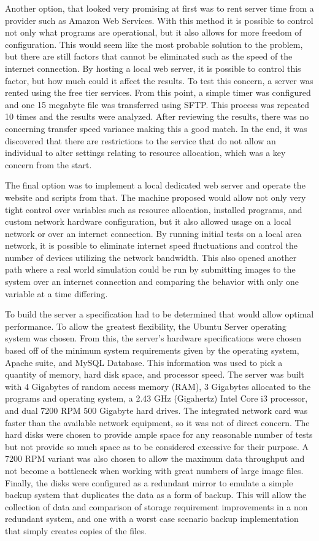 Another option, that looked very promising at first was to rent server time from a provider such as Amazon Web Services. With this method it is possible to control not only what programs are operational, but it also allows for more freedom of configuration. This would seem like the most probable solution to the problem, but there are still factors that cannot be eliminated such as the speed of the internet connection. By hosting a local web server, it is possible to control this factor, but how much could it affect the results. To test this concern, a server was rented using the free tier services. From this point, a simple timer was configured and one 15 megabyte file was transferred using SFTP. This process was repeated 10 times and the results were analyzed. After reviewing the results, there was no concerning transfer speed variance making this a good match. In the end, it was discovered that there are restrictions to the service that do not allow an individual to alter settings relating to resource allocation, which was a key concern from the start.

The final option was to implement a local dedicated web server and operate the website and scripts from that. The machine proposed would allow not only very tight control over variables such as resource allocation, installed programs, and custom network hardware configuration, but it also allowed usage on a local network or over an internet connection. By running initial tests on a local area network, it is possible to eliminate internet speed fluctuations and control the number of devices utilizing the network bandwidth. This also opened another path where a real world simulation could be run by submitting images to the system over an internet connection and comparing the behavior with only one variable at a time differing.

To build the server a specification had to be determined that would allow optimal performance. To allow the greatest flexibility, the Ubuntu Server operating system was chosen. From this, the server's hardware specifications were chosen based off of the minimum system requirements given by the operating system, Apache suite, and MySQL Database. This information was used to pick a quantity of memory, hard disk space, and processor speed. The server was built with 4 Gigabytes of random access memory (RAM), 3 Gigabytes allocated to the programs and operating system, a 2.43 GHz (Gigahertz) Intel Core i3 processor, and dual 7200 RPM 500 Gigabyte hard drives. The integrated network card was faster than the available network equipment, so it was not of direct concern. The hard disks were chosen to provide ample space for any reasonable number of tests but not provide so much space as to be considered excessive for their purpose. A 7200 RPM variant was also chosen to allow the maximum data throughput and not become a bottleneck when working with great numbers of large image files. Finally, the disks were configured as a redundant mirror to emulate a simple backup system that duplicates the data as a form of backup. This will allow the collection of data and comparison of storage requirement improvements in a non redundant system, and one with a worst case scenario backup implementation that simply creates copies of the files.

